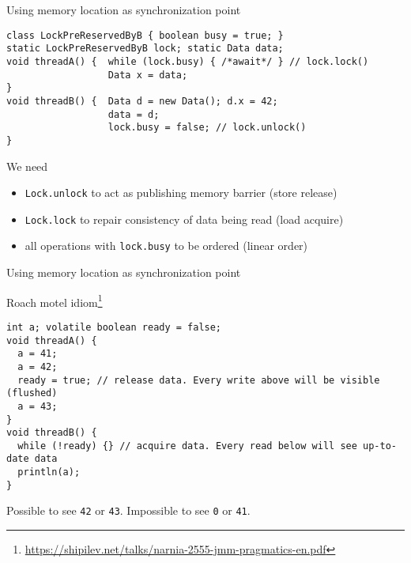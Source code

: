 \begin{frame}[t,fragile]{Using memory location as synchronization point}

\begin{verbatim}
class LockPreReservedByB { boolean busy = true; }
static LockPreReservedByB lock; static Data data;
void threadA() {  while (lock.busy) { /*await*/ } // lock.lock()
                  Data x = data;  
}
void threadB() {  Data d = new Data(); d.x = 42;
                  data = d;
                  lock.busy = false; // lock.unlock()
}
\end{verbatim}

\pause

We need 
\begin{itemize}
  \item \texttt{Lock.unlock} to act as publishing memory barrier (store release)
  \item \texttt{Lock.lock} to repair consistency of data being read (load acquire)
  \item all operations with \texttt{lock.busy} to be ordered (linear order)
\end{itemize}
\end{frame}


\begin{frame}[t,fragile]{Using memory location as synchronization point}

Roach motel idiom\footnote{\tiny\url{https://shipilev.net/talks/narnia-2555-jmm-pragmatics-en.pdf}}

\begin{verbatim}
int a; volatile boolean ready = false;
void threadA() {
  a = 41;
  a = 42;
  ready = true; // release data. Every write above will be visible (flushed)
  a = 43;
}
void threadB() {
  while (!ready) {} // acquire data. Every read below will see up-to-date data
  println(a);
}
\end{verbatim}

\pause

Possible to see \texttt{42} or \texttt{43}. Impossible to see \texttt{0} or \texttt{41}.

\end{frame}

